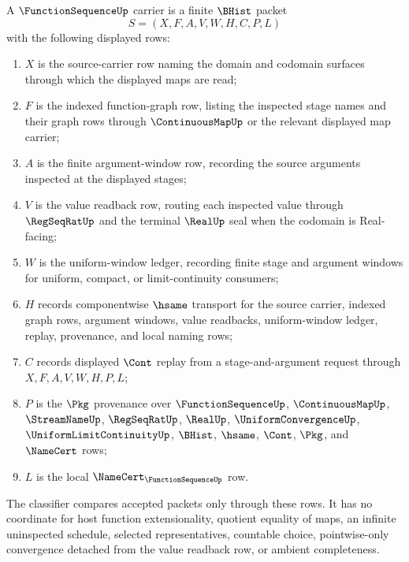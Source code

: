 \begin{definition}
\label{def:function-sequence-carrier}
A $\FunctionSequenceUp$ carrier is a finite $\BHist$ packet
$$
S=(X,F,A,V,W,H,C,P,L)
$$
with the following displayed rows:
\begin{enumerate}
\item $X$ is the source-carrier row naming the domain and codomain surfaces through which the displayed maps are read;
\item $F$ is the indexed function-graph row, listing the inspected stage names and their graph rows through $\ContinuousMapUp$ or the relevant displayed map carrier;
\item $A$ is the finite argument-window row, recording the source arguments inspected at the displayed stages;
\item $V$ is the value readback row, routing each inspected value through $\RegSeqRatUp$ and the terminal $\RealUp$ seal when the codomain is Real-facing;
\item $W$ is the uniform-window ledger, recording finite stage and argument windows for uniform, compact, or limit-continuity consumers;
\item $H$ records componentwise $\hsame$ transport for the source carrier, indexed graph rows, argument windows, value readbacks, uniform-window ledger, replay, provenance, and local naming rows;
\item $C$ records displayed $\Cont$ replay from a stage-and-argument request through $X,F,A,V,W,H,P,L$;
\item $P$ is the $\Pkg$ provenance over $\FunctionSequenceUp$, $\ContinuousMapUp$, $\StreamNameUp$, $\RegSeqRatUp$, $\RealUp$, $\UniformConvergenceUp$, $\UniformLimitContinuityUp$, $\BHist$, $\hsame$, $\Cont$, $\Pkg$, and $\NameCert$ rows;
\item $L$ is the local $\NameCert_{\FunctionSequenceUp}$ row.
\end{enumerate}
The classifier compares accepted packets only through these rows. It has no coordinate for host function extensionality, quotient equality of maps, an infinite uninspected schedule, selected representatives, countable choice, pointwise-only convergence detached from the value readback row, or ambient completeness.
\end{definition}

